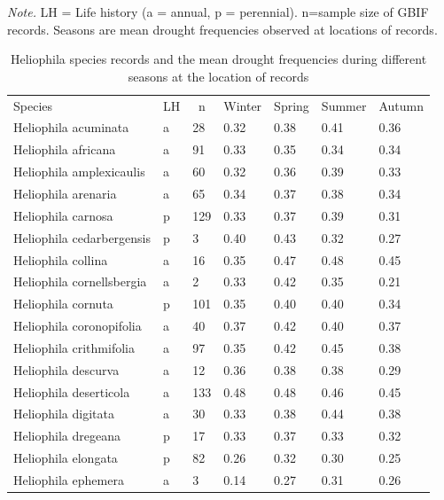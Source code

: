 \documentclass[man,floatsintext]{apa6}
\makeatletter
\newcommand\LastLTentrywidth{1em}
\newlength\longtablewidth
\newcommand{\getlongtablewidth}{\begingroup \ifcsname LT@\roman{LT@tables}\endcsname \global\longtablewidth=0pt \renewcommand{\LT@entry}[2]{\global\advance\longtablewidth by ##2\relax\gdef\LastLTentrywidth{##2}}\@nameuse{LT@\roman{LT@tables}} \fi \endgroup}
\theoremstyle{definition}
\theoremstyle{definition}
\theoremstyle{definition}
\theoremstyle{remark}
\makeatother
\begin{document}
\begin{center}
\begin{ThreePartTable}
\begin{TableNotes}[para]
\normalsize{\textit{Note.} LH = Life history (a = annual, p = perennial). n=sample size of GBIF records. Seasons are mean drought frequencies observed at locations of records.}
\end{TableNotes}
\small{
\begin{longtable}{lllllll}\noalign{\getlongtablewidth\global\LTcapwidth=\longtablewidth}
\caption{\label{tab:speciesmeanstable}Heliophila species records and the mean drought frequencies during different seasons at the location of records }\\
\toprule
Species & \multicolumn{1}{c}{LH} & \multicolumn{1}{c}{n} & \multicolumn{1}{c}{Winter} & \multicolumn{1}{c}{Spring} & \multicolumn{1}{c}{Summer} & \multicolumn{1}{c}{Autumn}\\
\midrule
Heliophila acuminata & a & 28 & 0.32 & 0.38 & 0.41 & 0.36\\
Heliophila africana & a & 91 & 0.33 & 0.35 & 0.34 & 0.34\\
Heliophila amplexicaulis & a & 60 & 0.32 & 0.36 & 0.39 & 0.33\\
Heliophila arenaria & a & 65 & 0.34 & 0.37 & 0.38 & 0.34\\
Heliophila carnosa & p & 129 & 0.33 & 0.37 & 0.39 & 0.31\\
Heliophila cedarbergensis & p & 3 & 0.40 & 0.43 & 0.32 & 0.27\\
Heliophila collina & a & 16 & 0.35 & 0.47 & 0.48 & 0.45\\
Heliophila cornellsbergia & a & 2 & 0.33 & 0.42 & 0.35 & 0.21\\
Heliophila cornuta & p & 101 & 0.35 & 0.40 & 0.40 & 0.34\\
Heliophila coronopifolia & a & 40 & 0.37 & 0.42 & 0.40 & 0.37\\
Heliophila crithmifolia & a & 97 & 0.35 & 0.42 & 0.45 & 0.38\\
Heliophila descurva & a & 12 & 0.36 & 0.38 & 0.38 & 0.29\\
Heliophila deserticola & a & 133 & 0.48 & 0.48 & 0.46 & 0.45\\
Heliophila digitata & a & 30 & 0.33 & 0.38 & 0.44 & 0.38\\
Heliophila dregeana & p & 17 & 0.33 & 0.37 & 0.33 & 0.32\\
Heliophila elongata & p & 82 & 0.26 & 0.32 & 0.30 & 0.25\\
Heliophila ephemera & a & 3 & 0.14 & 0.27 & 0.31 & 0.26\\

\end{longtable}}
\end{ThreePartTable}
\end{center}
\end{document}
